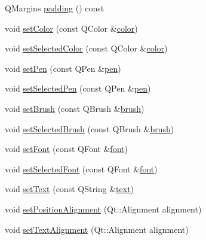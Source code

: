 \begin{DoxyCompactItemize}
Q\+Margins \mbox{\hyperlink{class_q_c_p_item_text_a5a598618350b40446d031fa9dc15fba7}{padding}} () const
\item 
void \mbox{\hyperlink{class_q_c_p_item_text_aa51efc0841fe52da9eaf8aff6fc8a8b2}{set\+Color}} (const Q\+Color \&\mbox{\hyperlink{class_q_c_p_item_text_a071ec7567ae4deae2262a5b861df7d54}{color}})
\item 
void \mbox{\hyperlink{class_q_c_p_item_text_ae7ba0bdb75c897b028388e45bfd435fa}{set\+Selected\+Color}} (const Q\+Color \&\mbox{\hyperlink{class_q_c_p_item_text_a071ec7567ae4deae2262a5b861df7d54}{color}})
\item 
void \mbox{\hyperlink{class_q_c_p_item_text_a9b9ec6eea0eb0603977ff84d4c78d0a3}{set\+Pen}} (const Q\+Pen \&\mbox{\hyperlink{class_q_c_p_item_text_a7039d313069547682f28688448333979}{pen}})
\item 
void \mbox{\hyperlink{class_q_c_p_item_text_a291febe586f0da3f1c392e77bef4aa20}{set\+Selected\+Pen}} (const Q\+Pen \&\mbox{\hyperlink{class_q_c_p_item_text_a7039d313069547682f28688448333979}{pen}})
\item 
void \mbox{\hyperlink{class_q_c_p_item_text_a1c7e131516df2ed8d941ef31240ded8e}{set\+Brush}} (const Q\+Brush \&\mbox{\hyperlink{class_q_c_p_item_text_a2600b9b419f17e2e2381f5ed8267da62}{brush}})
\item 
void \mbox{\hyperlink{class_q_c_p_item_text_a6b8377eeb2af75eb9528422671ac16cb}{set\+Selected\+Brush}} (const Q\+Brush \&\mbox{\hyperlink{class_q_c_p_item_text_a2600b9b419f17e2e2381f5ed8267da62}{brush}})
\item 
void \mbox{\hyperlink{class_q_c_p_item_text_a94ad60ebe04f5c07c35e7c2029e96b1f}{set\+Font}} (const Q\+Font \&\mbox{\hyperlink{class_q_c_p_item_text_a44a564431890ffdfe0f978f8732cfb81}{font}})
\item 
void \mbox{\hyperlink{class_q_c_p_item_text_a0be2841772f83663c4db307928b82816}{set\+Selected\+Font}} (const Q\+Font \&\mbox{\hyperlink{class_q_c_p_item_text_a44a564431890ffdfe0f978f8732cfb81}{font}})
\item 
void \mbox{\hyperlink{class_q_c_p_item_text_a3dacdda0ac88f99a05b333b977c48747}{set\+Text}} (const Q\+String \&\mbox{\hyperlink{class_q_c_p_item_text_ad71c9e83ee3556d9d617eca854e8eb18}{text}})
\item 
void \mbox{\hyperlink{class_q_c_p_item_text_a781cdf8c640fc6a055dcff1e675c8c7a}{set\+Position\+Alignment}} (Qt\+::\+Alignment alignment)
\item 
void \mbox{\hyperlink{class_q_c_p_item_text_ab5bc0684c4d1bed81949a11b34dba478}{set\+Text\+Alignment}} (Qt\+::\+Alignment alignment)

\end{DoxyCompactItemize}
